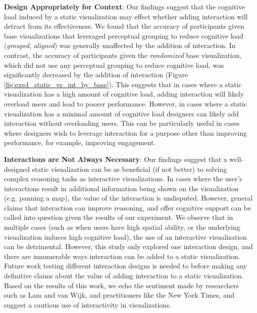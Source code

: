 \vspace{6pt} \noindent \textbf{Design Appropriately for Context}:
Our findings suggest that the cognitive load induced by a static visualization may effect whether adding interaction will detract from its effectiveness. We found that the accuracy of participants given base visualizations that leveraged perceptual grouping to reduce cognitive load (\textit{grouped}, \textit{aligned}) was generally unaffected by the addition of interaction. In contrast, the accuracy of participants given the \textit{randomized} base visualization, which did not use any perceptual grouping to reduce cognitive load, was significantly decreased by the addition of interaction (Figure \ref{fig:exp1_static_vs_int_by_base}). This suggests that in cases where a static visualization has a high amount of cognitive load, adding interaction will likely overload users and lead to poorer performance. However, in cases where a static visualization has a minimal amount of cognitive load designers can likely add interaction without overloading users. This can be particularly useful in cases where designers wish to leverage interaction for a purpose other than improving performance, for example, improving engagement.  

\vspace{6pt} \noindent \textbf{Interactions are Not Always Necessary}: Our findings suggest that a well-designed static visualization can be as beneficial (if not better) to solving complex reasoning tasks as interactive visualizations.
In cases where the user's interactions result in additional information being shown on the visualization (e.g. panning a map), the value of the interaction is undisputed.
However, general claims that interaction can improve reasoning, and offer cognitive support can be called into question given the results of our experiment.
We observe that in multiple cases (such as when users have high spatial ability, or the underlying visualization induces high cognitive load), the use of an interactive visualization can be detrimental. However, this study only explored one interaction design, and there are innumerable ways interaction can be added to a static visualization. Future work testing different interaction designs is needed to before making any definitive claims about the value of adding interaction to a static visualization. Based on the results of this work, we echo the sentiment made by researchers such as Lam\cite{lam2008Framework} and van Wijk\cite{wijk2005Value}, and practitioners like the New York Times, and suggest a cautious use of interactivity in visualizations.

